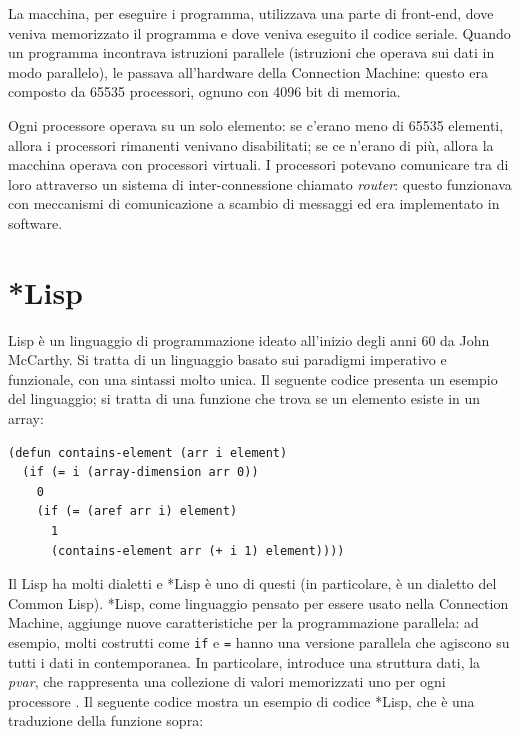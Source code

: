 \documentclass[12pt,a4paper,openright,twoside]{report}
\begin{document}
La macchina, per eseguire i programma, utilizzava una parte di front-end, dove veniva memorizzato il programma e dove veniva eseguito il codice seriale. Quando un programma incontrava istruzioni parallele (istruzioni che operava sui dati in modo parallelo), le passava all'hardware della Connection Machine: questo era composto da 65535 processori, ognuno con 4096 bit di memoria.

Ogni processore operava su un solo elemento: se c'erano meno di 65535 elementi, allora i processori rimanenti venivano disabilitati; se ce n'erano di più, allora la macchina operava con processori virtuali. I processori potevano comunicare tra di loro attraverso un sistema di inter-connessione chiamato \textit{router}: questo funzionava con meccanismi di comunicazione a scambio di messaggi ed era implementato in software.

\section{*Lisp}

Lisp è un linguaggio di programmazione ideato all'inizio degli anni 60 da John McCarthy. Si tratta di un linguaggio basato sui paradigmi imperativo e funzionale, con una sintassi molto unica. Il seguente codice presenta un esempio del linguaggio; si tratta di una funzione che trova se un elemento esiste in un array:

\newpage

\begin{lstlisting}[caption={Esempio di codice Lisp. Questa funzione implementa la ricerca nell'array in maniera ricorsiva, in concordanza con il paradigma funzionale.}]
(defun contains-element (arr i element)
  (if (= i (array-dimension arr 0))
    0
    (if (= (aref arr i) element)
      1
      (contains-element arr (+ i 1) element))))
\end{lstlisting}

Il Lisp ha molti dialetti e *Lisp è uno di questi (in particolare, è un dialetto del Common Lisp). *Lisp, come linguaggio pensato per essere usato nella Connection Machine, aggiunge nuove caratteristiche per la programmazione parallela: ad esempio, molti costrutti come \verb|if| e \verb|=| hanno una versione parallela che agiscono su tutti i dati in contemporanea. In particolare, introduce una struttura dati, la \textit{pvar}, che rappresenta una collezione di valori memorizzati uno per ogni processore \cite{starlisp}. Il seguente codice mostra un esempio di codice *Lisp, che è una traduzione della funzione sopra:
\end{document}
